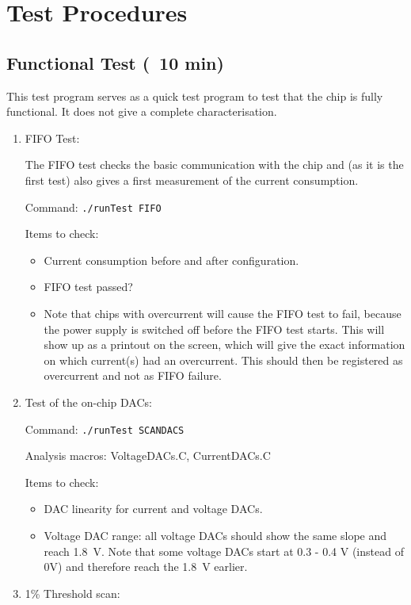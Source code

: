 \documentclass{article}
\let\oldsection\section
\renewcommand\section{\clearpage\oldsection}
\begin{document}
\section{Test Procedures}
\subsection{Functional Test (~10 min)}

This test program serves as a quick test program to test that the chip is fully functional. It does not give a complete characterisation. 

\begin{enumerate}
\item{FIFO Test:

The FIFO test checks the basic communication with the chip and (as it is the first test) also gives a first measurement of the current consumption. 

Command: \texttt{./runTest FIFO}

Items to check: 
\begin{itemize}
\item{Current consumption before and after configuration.}
\item{ FIFO test passed?}
\item{ Note that chips with overcurrent will cause the FIFO test to fail, because the power supply is switched off before the FIFO test starts. This will show up as a printout on the screen, which will give the exact information on which current(s) had an overcurrent. This should then be registered as overcurrent and not as FIFO failure.}
\end{itemize}
}

\item{Test of the on-chip DACs:

Command: \texttt{./runTest SCANDACS}

Analysis macros: VoltageDACs.C, CurrentDACs.C

Items to check:
\begin{itemize}
\item{DAC linearity for current and voltage DACs.}
\item{Voltage DAC range: all voltage DACs should show the same slope and reach 1.8~V. Note that some voltage DACs start at 0.3 - 0.4 V (instead of 0V) and therefore reach the 1.8~V earlier.}
\end{itemize}
}

\item{1\% Threshold scan:

}
\end{enumerate}
\end{document}
